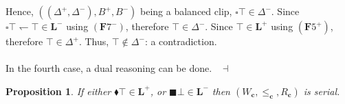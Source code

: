 \documentclass[draft]{article}
\newtheorem{proposition}{Proposition}
\newenvironment{proof}{{\bf Proof:}}{~$\dashv$\\}
\def\Formula{\mathbf{A}}
\def\Formula{\mathbf{F}}
\def\Rule{\mathbf{R}}
\def\L{\mathbf{L}}
\begin{document}
\begin{proof}
Hence, $((\Delta^{+},\Delta^{-}),B^{+},B^{-})$ being a balan\-ced clip, ${\square}{\top}{\in}\Delta^{-}$.
Since ${\square}{\top}{\leftharpoondown}{\top}{\in}\L^{-}$ using $(\Formula7^{-})$, therefore ${\top}{\in}\Delta^{-}$.
Since ${\top}{\in}\L^{+}$ using $(\Formula5^{+})$, therefore ${\top}{\in}\Delta^{+}$.
Thus, ${\top}{\not\in}\Delta^{-}$: a contradiction.
%
%
\\
\\
%
%
In the fourth case, a dual reasoning can be done.
%
%
\medskip
%
%
\end{proof}
%
%
\begin{proposition}\label{Proposition:the:following:conditions:are:equivalent:is:serial}
%
%
If either ${\blacklozenge}{\top}{\in}\L^{+}$, or ${\blacksquare}{\bot}{\in}\L^{-}$ then $(W_{\mathbf{c}},{\leq_{\mathbf{c}}},{R_{\mathbf{c}}})$ is serial.
%
%
\end{proposition}
%
%
\end{document}
